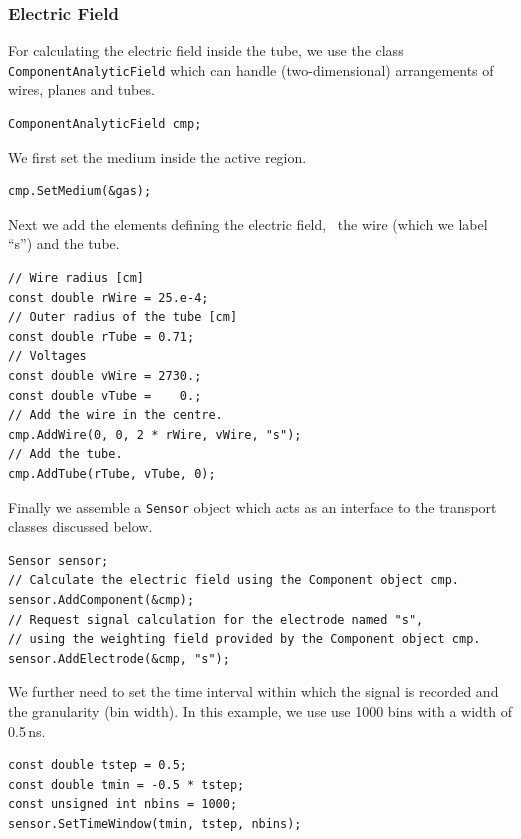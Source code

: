 \subsubsection{Electric Field}
For calculating the electric field inside the tube, 
we use the class \texttt{ComponentAnalyticField} which can handle 
(two-dimensional) arrangements of wires, planes and tubes.
\begin{lstlisting}
ComponentAnalyticField cmp;
\end{lstlisting}
We first set the medium inside the active region. 
\begin{lstlisting}
cmp.SetMedium(&gas); 
\end{lstlisting}
Next we add the elements defining the electric field, 
\ie~the wire (which we label ``s'') and the tube.
\begin{lstlisting}
// Wire radius [cm]
const double rWire = 25.e-4;
// Outer radius of the tube [cm]
const double rTube = 0.71;
// Voltages
const double vWire = 2730.;
const double vTube =    0.;
// Add the wire in the centre.
cmp.AddWire(0, 0, 2 * rWire, vWire, "s");
// Add the tube.
cmp.AddTube(rTube, vTube, 0);
\end{lstlisting}
 
Finally we assemble a \texttt{Sensor} object which acts as an 
interface to the transport classes discussed below.
\begin{lstlisting}
Sensor sensor;
// Calculate the electric field using the Component object cmp.
sensor.AddComponent(&cmp);
// Request signal calculation for the electrode named "s", 
// using the weighting field provided by the Component object cmp.
sensor.AddElectrode(&cmp, "s"); 
\end{lstlisting}
We further need to set the time interval within which the
signal is recorded and the granularity (bin width). 
In this example, we use use 1000 bins with a width of 0.5\,ns.
\begin{lstlisting}
const double tstep = 0.5;
const double tmin = -0.5 * tstep;
const unsigned int nbins = 1000;
sensor.SetTimeWindow(tmin, tstep, nbins);
\end{lstlisting}

